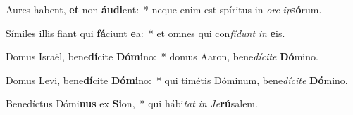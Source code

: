 \item Aures habent, \textbf{et} non \textbf{áu}\textbf{di}ent:~* neque enim est spíritus in \textit{o}\textit{re} \textit{ip}\textbf{só}rum.
\item Símiles illis fiant qui \textbf{fá}ciunt \textbf{e}a:~* et omnes qui con\textit{fí}\textit{dunt} \textit{in} \textbf{e}is.
\item Domus Israël, bene\textbf{dí}cite \textbf{Dó}\textbf{mi}no:~* domus Aaron, bene\textit{dí}\textit{ci}\textit{te} \textbf{Dó}mino.
\item Domus Levi, bene\textbf{dí}cite \textbf{Dó}\textbf{mi}no:~* qui timétis Dóminum, bene\textit{dí}\textit{ci}\textit{te} \textbf{Dó}mino.
\item Benedíctus Dómi\textbf{nus} ex \textbf{Si}on,~* qui hábi\textit{tat} \textit{in} \textit{Je}\textbf{rú}salem.
